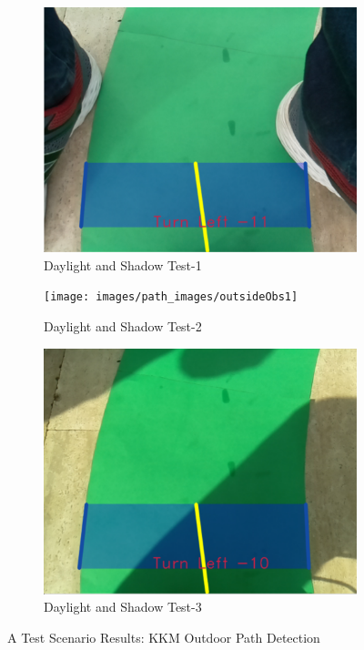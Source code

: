 \documentclass[a4paper,12pt]{article}
\begin{document}
	\begin{figure}[H]
	\setlength{\unitlength}{\textwidth} 
	\centering
	\begin{subfigure}{.31\textwidth}
		\centering
		\includegraphics[width=0.30\unitlength]{images/path_images/outsideObs0}
		\caption{\label{fig:dataP_outsideObs0} Daylight and Shadow Test-1}
	\end{subfigure}%
	\begin{subfigure}{.31\textwidth}
		\centering
		\texttt{[image: images/path\_images/outsideObs1]}
		\caption{\label{fig:dataP_outsideObs1} Daylight and Shadow Test-2}
	\end{subfigure}
		\begin{subfigure}{.31\textwidth}
		\centering
		\includegraphics[width=0.30\unitlength]{images/path_images/outsideObs2}
		\caption{\label{fig:dataP_outsideObs2} Daylight and Shadow Test-3}
	\end{subfigure}
	\caption{\label{fig:dataP_outside} A Test Scenario Results: KKM Outdoor Path Detection}
\end{figure}	
		
\end{document}
